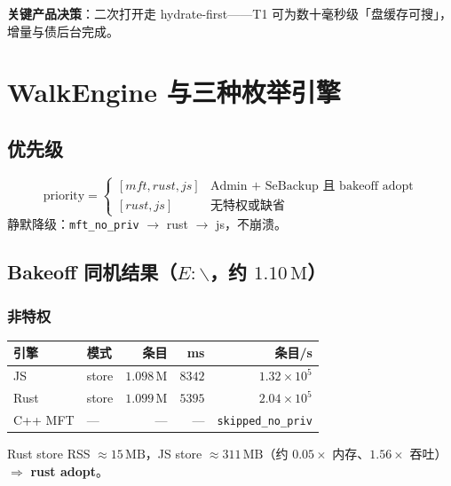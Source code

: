 \documentclass[UTF8,a4paper,11pt]{ctexart}
\begin{document}
\textbf{关键产品决策}：二次打开走 hydrate-first——T1 可为数十毫秒级「盘缓存可搜」，增量与债后台完成。

\section{WalkEngine 与三种枚举引擎}

\subsection{优先级}
\[
\mathrm{priority} =
\begin{cases}
[mft, rust, js] & \text{Admin + SeBackup 且 bakeoff adopt} \\
[rust, js] & \text{无特权或缺省}
\end{cases}
\]
静默降级：\texttt{mft\_no\_priv} $\to$ rust $\to$ js，不崩溃。

\subsection{Bakeoff 同机结果（$E{:}\backslash$，约 $1.10\,\mathrm{M}$）}

\subsubsection*{非特权}
\begin{center}
\begin{tabular}{@{}llrrr@{}}
\toprule
引擎 & 模式 & 条目 & ms & 条目/s \\
\midrule
JS & store & $1.098\,\mathrm{M}$ & $8342$ & $1.32\times 10^5$ \\
Rust & store & $1.099\,\mathrm{M}$ & $5395$ & $2.04\times 10^5$ \\
C++ MFT & — & — & — & \texttt{skipped\_no\_priv} \\
\bottomrule
\end{tabular}
\end{center}
Rust store RSS $\approx 15\,\mathrm{MB}$，JS store $\approx 311\,\mathrm{MB}$（约 $0.05\times$ 内存、$1.56\times$ 吞吐）$\Rightarrow$ \textbf{rust adopt}。
\end{document}
